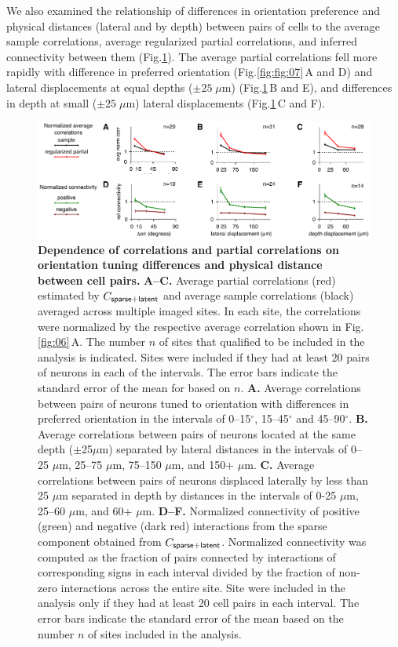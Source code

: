 \documentclass[10pt]{article}
\newcommand{\figref}[2]{Fig.\;\ref{fig:#1}\,#2}
\begin{document}
We also examined the relationship of differences in orientation preference and physical distances (lateral and by depth) between pairs of cells to the average sample correlations, average regularized partial correlations, and inferred connectivity between them (Fig.\;\ref{fig:07}). The average partial correlations fell more rapidly with difference in preferred orientation (\figref{fig:07}{A and D}) and lateral displacements at equal depths ($\pm 25\;\mu$m) (\figref{07}{B and E}), and differences in depth at small ($\pm 25\;\mu$m) lateral displacements (\figref{07}{C and F}).

\begin{figure}[!ht]
    \begin{center}
        \includegraphics{./figures/Figure07.pdf}
    \end{center}
    \caption{{\bf Dependence of correlations and partial correlations on orientation tuning differences and physical distance between cell pairs.}
    {\bf A--C.} Average partial correlations (red) estimated by $C_{\sf sparse+latent}$ and average sample correlations (black) averaged across multiple imaged sites. In each site, the correlations were normalized by the respective average correlation shown in Fig.\;\ref{fig:06}\,A.  The number $n$ of sites that qualified to be included in the analysis is indicated. Sites were included if they had at least 20 pairs of neurons in each of the intervals. The error bars indicate the standard error of the mean for based on $n$.
    {\bf A.} Average correlations between pairs of neurons tuned to orientation with differences in preferred orientation in the intervals of 0--15$^\circ$, 15--45$^\circ$ and 45--90$^\circ$. 
    {\bf B.} Average correlations between pairs of neurons located at the same depth ($\pm$25$\mu$m) separated by lateral distances in the intervals of 0--25 $\mu$m, 25--75 $\mu$m, 75--150 $\mu$m, and 150+ $\mu$m.
    {\bf C.} Average correlations between pairs of neurons displaced laterally by less than 25 $\mu$m separated in depth by distances in the intervals of 0-25 $\mu$m, 25--60 $\mu$m, and 60+ $\mu$m.
    {\bf D--F.} Normalized connectivity of positive (green) and negative (dark red) interactions from the sparse component obtained from $C_{\sf sparse+latent}$. Normalized connectivity was computed as the fraction of pairs connected by interactions of corresponding signs in each interval divided by the fraction of non-zero interactions across the entire site. Site were included in the analysis only if they had at least 20 cell pairs in each interval. The error bars indicate the standard error of the mean based on the number $n$ of sites included in the analysis.
}
\label{fig:07}
\end{figure}
\end{document}
